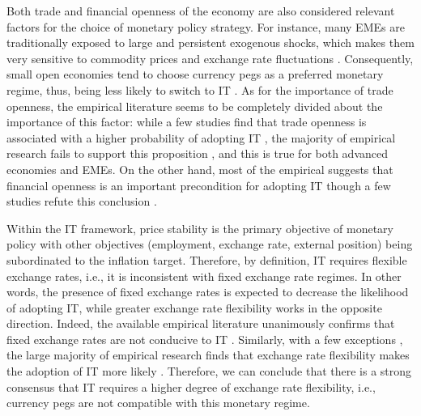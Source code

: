 \documentclass{article}
\begin{document}
Both trade and financial openness of the economy are also considered relevant factors for the choice of monetary policy strategy. For instance, many EMEs are traditionally exposed to large and persistent exogenous shocks, which makes them very sensitive to commodity prices and exchange rate fluctuations \citep{Fraga2003}. Consequently, small open economies tend to choose currency pegs as a preferred monetary regime, thus, being less likely to switch to IT \citep{IMF2006, Rose2014}. As for the importance of trade openness, the empirical literature seems to be completely divided about the importance of this factor: while a few studies find that trade openness is associated with a higher probability of adopting IT \citep{Leyva2008, Lucotte2010, Mishkin2002}, the majority of empirical research fails to support this proposition \citep{Arsic2022, deMendonca2012, Fouejieu2017, Fry-McKibbin2014, Hu2006, Lucotte2012, Lin2010, Lin2007, Lin2009, Minea2021, Minea2014, Rose2014, Samarina2014, Samarina2014, Thornton2017, Vega2005}, and this is true for both advanced economies and EMEs. On the other hand, most of the empirical suggests that financial openness is an important precondition for adopting IT \citep{deMendonca2012, Samarina2014, Thornton2017} though a few studies refute this conclusion \citep{Rose2014, Samarina2014, Samarina2014}.

Within the IT framework, price stability is the primary objective of monetary policy with other objectives (employment, exchange rate, external position) being subordinated to the inflation target. Therefore, by definition, IT requires flexible exchange rates, i.e., it is inconsistent with fixed exchange rate regimes. In other words, the presence of fixed exchange rates is expected to decrease the likelihood of adopting IT, while greater exchange rate flexibility works in the opposite direction. Indeed, the available empirical literature unanimously confirms that fixed exchange rates are not conducive to IT \citep{Ardakani2018, Arsic2022, deMendonca2012, Fouejieu2017, Fry-McKibbin2014, Lin2010, Lin2007, Lin2009, Minea2014}. Similarly, with a few exceptions \citep{Hu2006, Samarina2014}, the large majority of empirical research finds that exchange rate flexibility makes the adoption of IT more likely \citep{Ismailov2016, Lucotte2010, Lucotte2012, Minea2021, Mukherjee2008, Pontines2013, Samarina2014, Samarina2014, Thornton2017, Vega2005}. Therefore, we can conclude that there is a strong consensus that IT requires a higher degree of exchange rate flexibility, i.e., currency pegs are not compatible with this monetary regime.
\end{document}
